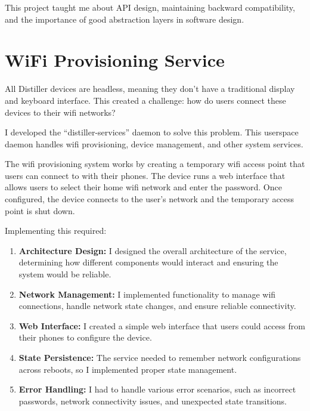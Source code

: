 \documentclass[12pt,a4paper]{report}
\begin{document}
\vspace{0.3cm}

This project taught me about API design, maintaining backward compatibility, and the importance of good abstraction layers in software design.

\section{WiFi Provisioning Service}

All Distiller devices are headless, meaning they don't have a traditional display and keyboard interface. This created a challenge: how do users connect these devices to their wifi networks?

\vspace{0.3cm}

I developed the ``distiller-services'' daemon to solve this problem. This userspace daemon handles wifi provisioning, device management, and other system services.

\vspace{0.3cm}

The wifi provisioning system works by creating a temporary wifi access point that users can connect to with their phones. The device runs a web interface that allows users to select their home wifi network and enter the password. Once configured, the device connects to the user's network and the temporary access point is shut down.

\vspace{0.3cm}

Implementing this required:

\begin{enumerate}[itemsep=0.3cm]
    \item \textbf{Architecture Design:} I designed the overall architecture of the service, determining how different components would interact and ensuring the system would be reliable.

    \item \textbf{Network Management:} I implemented functionality to manage wifi connections, handle network state changes, and ensure reliable connectivity.

    \item \textbf{Web Interface:} I created a simple web interface that users could access from their phones to configure the device.

    \item \textbf{State Persistence:} The service needed to remember network configurations across reboots, so I implemented proper state management.

    \item \textbf{Error Handling:} I had to handle various error scenarios, such as incorrect passwords, network connectivity issues, and unexpected state transitions.
\end{enumerate}
\end{document}
